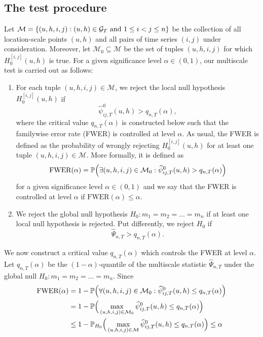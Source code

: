 \documentclass[12pt]{article}
\begin{document}
\subsection{The test procedure}\label{subsec:test:test}


Let $\mathcal{M} = \{ (u,h,i,j): (u,h) \in \mathcal{G}_T \text{ and } 1 \le i < j \le n \}$ be the collection of all location-scale points $(u,h)$ and all pairs of time series $(i,j)$ under consideration. Moreover, let $\mathcal{M}_0 \subseteq \mathcal{M}$ be the set of tuples $(u,h,i,j)$ for which $H_0^{[i, j]}(u, h)$ is true.
For a given significance level $\alpha \in (0,1)$, our multiscale test is carried out as follows: 
\begin{enumerate}[label=(\roman*),leftmargin=0.75cm]

\item For each tuple $(u,h,i,j) \in \mathcal{M}$, we reject the local null hypothesis $H_0^{[i, j]}(u, h)$ if 
\[ \widehat{\psi}^0_{ij, T}(u, h) > q_{n,T}(\alpha), \]
where the critical value $q_{n,T}(\alpha)$ is constructed below such that the familywise error rate (FWER) is controlled at level $\alpha$. As usual, the FWER is defined as the probability of wrongly rejecting $H_0^{[i, j]}(u, h)$ for at least one tuple $(u,h,i,j) \in \mathcal{M}$. More formally, it is defined as 
\[ \text{FWER}(\alpha) = \mathbb{P} \Big( \exists (u,h,i,j) \in \mathcal{M}_0 : \widehat{\psi}^0_{ij, T}(u, h) > q_{n,T}(\alpha) \Big) \]
for a given significance level $\alpha \in (0,1)$ and we say that the FWER is controlled at level $\alpha$ if $\text{FWER}(\alpha) \le \alpha$.

\item We reject the global null hypothesis $H_0: m_1 = m_2 = \ldots = m_n$ if at least one local null hypothesis is rejected. Put differently, we reject $H_0$ if 
\[ \widehat{\Psi}_{n,T} > q_{n,T}(\alpha). \]

\end{enumerate}
We now construct a critical value $q_{n,T}(\alpha)$ which controls the FWER at level $\alpha$. Let $q_{n,T}(\alpha)$ be the $(1-\alpha)$-quantile of the multiscale statistic $\widehat{\Psi}_{n,T}$ under the global null $H_0: m_1 = m_2 = \ldots = m_n$. Since
\begin{align*} 
\text{FWER}(\alpha)
 & = 1 - \mathbb{P} \Big( \forall (u,h,i,j) \in \mathcal{M}_0 : \widehat{\psi}^0_{ij, T}(u, h) \le q_{n,T}(\alpha) \Big) \\
 & = 1 - \mathbb{P} \Big( \max_{ (u,h,i,j) \in \mathcal{M}_0} \widehat{\psi}^0_{ij, T}(u, h) \le q_{n,T}(\alpha) \Big) \\
 & \le 1 - \mathbb{P}_{H_0} \Big( \max_{ (u,h,i,j) \in \mathcal{M}} \widehat{\psi}^0_{ij, T}(u, h) \le q_{n,T}(\alpha) \Big) \le \alpha 
\end{align*}
\end{document}
